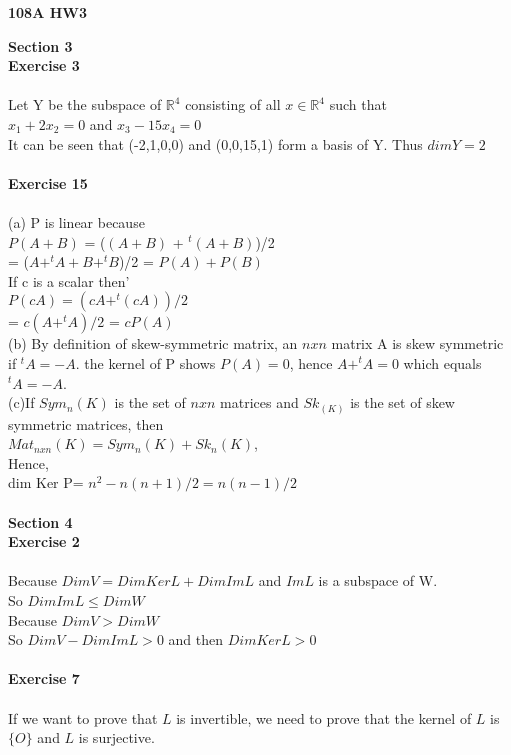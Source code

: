 \documentclass[12pt]{amsart}
\begin{document}
\begin{center}
{\bf 108A HW3 }\\

\end{center}
\textbf{Section 3} \\
\textbf{Exercise 3}\\
\\
Let Y be the subspace of $\mathbb{R}^4$ consisting of all $x \in \mathbb{R}^4$ such that\\ 
$x_1 + 2x_2 =0$ and $x_3 - 15x_4 =0$\\
It can be seen that (-2,1,0,0) and (0,0,15,1) form a basis of Y. Thus $dim Y = 2$\\
\\
\textbf{Exercise 15}\\
\\
(a) P is linear because\\
$P(A+B)$ = ($(A+B)$ + $^t\!(A+B)$)/2\\
= ($A+^t\!A + B + ^t\!B$)/2 = $P(A)+P(B)$\\
If c is a scalar then'\\
$P(cA) = (cA + ^t\!(cA))/2$\\
= $c(A+^t\!A)/2$ = $cP(A)$\\
(b) By definition of skew-symmetric matrix, an $nxn$ matrix A is skew symmetric if $^t\!A=-A$. the kernel of P shows $P(A)=0$, hence $A+^t\!A=0$ which equals $^t\!A=-A$.\\
(c)If $Sym_n(K)$ is the set of $nxn$ matrices and $Sk_(K)$ is the set of skew symmetric matrices, then\\
$Mat_{nxn}(K)=Sym_n(K)+Sk_n(K)$,\\
Hence,\\
dim Ker P= $n^2- n(n+1)/2= n(n-1)/2$
\\
\\
\textbf{Section 4} \\
\textbf{Exercise 2}\\
\\
\noindent Because $DimV = Dim KerL + Dim ImL$ and $ImL$ is a subspace of W.\\
So $Dim ImL \leq Dim W$\\
Because $DimV > DimW$\\
So $DimV - DimImL > 0$ and then $DimKerL > 0$\\
\\
\textbf{Exercise 7}\\
\\
\noindent If we want to prove that $L$ is invertible, we need to prove that the kernel of $L$ is $\{O\}$ and $L$ is surjective.\\
\end{document}
